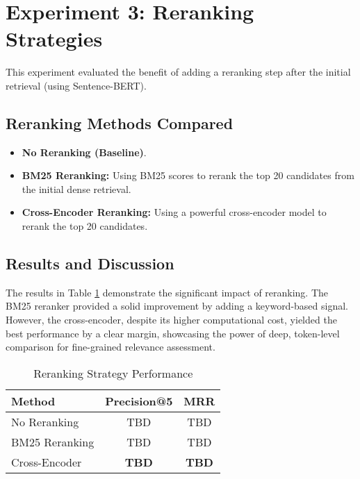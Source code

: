 \section{Experiment 3: Reranking Strategies}
\label{sec:exp_reranking}
This experiment evaluated the benefit of adding a reranking step after the initial retrieval (using Sentence-BERT).
\subsection{Reranking Methods Compared}
\begin{itemize}
    \item \textbf{No Reranking (Baseline)}.
    \item \textbf{BM25 Reranking:} Using BM25 scores to rerank the top 20 candidates from the initial dense retrieval.
    \item \textbf{Cross-Encoder Reranking:} Using a powerful cross-encoder model to rerank the top 20 candidates.
\end{itemize}
\subsection{Results and Discussion}
The results in Table \ref{tab:reranking_results} demonstrate the significant impact of reranking. The BM25 reranker provided a solid improvement by adding a keyword-based signal. However, the cross-encoder, despite its higher computational cost, yielded the best performance by a clear margin, showcasing the power of deep, token-level comparison for fine-grained relevance assessment.

\begin{table}[h!]
\centering
\caption{Reranking Strategy Performance}
\label{tab:reranking_results}
\begin{tabular}{|l|c|c|}
\hline
\textbf{Method} & \textbf{Precision@5} & \textbf{MRR} \\
\hline
No Reranking & TBD & TBD \\
BM25 Reranking & TBD & TBD \\
Cross-Encoder & \textbf{TBD} & \textbf{TBD} \\
\hline
\end{tabular}
\end{table}

